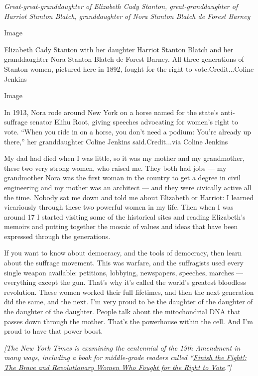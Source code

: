 \emph{Great-great-granddaughter of Elizabeth Cady Stanton,
great-granddaughter of Harriot Stanton Blatch, granddaughter of Nora
Stanton Blatch de Forest Barney}

Image

Elizabeth Cady Stanton with her daughter Harriot Stanton Blatch and her
granddaughter Nora Stanton Blatch de Forest Barney. All three
generations of Stanton women, pictured here in 1892, fought for the
right to vote.Credit...Coline Jenkins

Image

In 1913, Nora rode around New York on a horse named for the state's
anti-suffrage senator Elihu Root, giving speeches advocating for women's
right to vote. ``When you ride in on a horse, you don't need a podium:
You're already up there,'' her granddaughter Coline Jenkins
said.Credit...via Coline Jenkins

My dad had died when I was little, so it was my mother and my
grandmother, these two very strong women, who raised me. They both had
jobs --- my grandmother Nora was the first woman in the country to get a
degree in civil engineering and my mother was an architect --- and they
were civically active all the time. Nobody sat me down and told me about
Elizabeth or Harriot: I learned vicariously through these two powerful
women in my life. Then when I was around 17 I started visiting some of
the historical sites and reading Elizabeth's memoirs and putting
together the mosaic of values and ideas that have been expressed through
the generations.

If you want to know about democracy, and the tools of democracy, then
learn about the suffrage movement. This was warfare, and the suffragists
used every single weapon available: petitions, lobbying, newspapers,
speeches, marches --- everything except the gun. That's why it's called
the world's greatest bloodless revolution. These women worked their full
lifetimes, and then the next generation did the same, and the next. I'm
very proud to be the daughter of the daughter of the daughter of the
daughter. People talk about the mitochondrial DNA that passes down
through the mother. That's the powerhouse within the cell. And I'm proud
to have that power boost.

\emph{{[}The New York Times is examining the centennial of the 19th
Amendment in many ways, including a book for middle-grade readers called
``}\href{https://www.nytimes.com/2020/07/24/books/finish-the-fight-excerpt.html}{\emph{Finish
the Fight!: The Brave and Revolutionary Women Who Fought for the Right
to Vote}}\emph{.''{]}}

